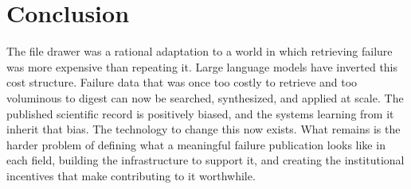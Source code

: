 \section{Conclusion}
\label{sec:conclusion}

The file drawer was a rational adaptation to a world in which
retrieving failure was more expensive than repeating it. Large
language models have inverted this cost structure. Failure data that
was once too costly to retrieve and too voluminous to digest can now
be searched, synthesized, and applied at scale. The published
scientific record is positively biased, and the systems learning
from it inherit that bias. The technology to change this now exists.
What remains is the harder problem of defining what a meaningful
failure publication looks like in each field, building the
infrastructure to support it, and creating the institutional
incentives that make contributing to it worthwhile.